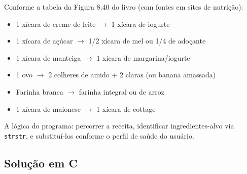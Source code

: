 \documentclass[12pt,a4paper]{article}
\begin{document}
\begin{pesquisa}
Conforme a tabela da Figura 8.40 do livro (com fontes em sites de nutrição):
\begin{itemize}[noitemsep]
  \item 1 xícara de creme de leite $\to$ 1 xícara de iogurte
  \item 1 xícara de açúcar $\to$ 1/2 xícara de mel ou 1/4 de adoçante
  \item 1 xícara de manteiga $\to$ 1 xícara de margarina/iogurte
  \item 1 ovo $\to$ 2 colheres de amido + 2 claras (ou banana amassada)
  \item Farinha branca $\to$ farinha integral ou de arroz
  \item 1 xícara de maionese $\to$ 1 xícara de cottage
\end{itemize}

A lógica do programa: percorrer a receita, identificar ingredientes-alvo via
\texttt{strstr}, e substituí-los conforme o perfil de saúde do usuário.
\end{pesquisa}

\subsection*{Solução em C}
\end{document}
